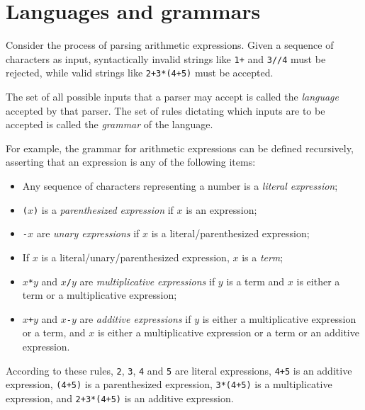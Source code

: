 \documentclass[UdineBachThesis,american,11pt]{PhdThesis}
\begin{document}
  \section{Languages and grammars}

  Consider the process of parsing arithmetic expressions. Given a sequence of
  characters as input, syntactically invalid strings like \mbox{\texttt{1+}} and
  \mbox{\texttt{3//4}} must be rejected, while valid strings like
  \mbox{\texttt{2+3*(4+5)}} must be accepted.

  The set of all possible inputs that a parser may accept is called the
  \emph{language} accepted by that parser. The set of rules dictating which
  inputs are to be accepted is called the \emph{grammar} of the language.

  For example, the grammar for arithmetic expressions can be defined
  recursively, asserting that an expression is any of the following items:

  \begin{itemize}
    \item Any sequence of characters representing a number is a \emph{literal
    expression};

    \item \mbox{\texttt{($x$)}} is a \emph{parenthesized expression} if $x$ is
    an expression;

    \item \mbox{\texttt{-$x$}} are \emph{unary expressions} if $x$ is a
    literal/parenthesized expression;

    \item If $x$ is a literal/unary/parenthesized expression, $x$ is a
    \emph{term};

    \item \mbox{\texttt{$x$*$y$}} and \mbox{\texttt{$x$/$y$}} are
    \emph{multiplicative expressions} if $y$ is a term and $x$ is either a term
    or a multiplicative expression;

    \item \mbox{\texttt{$x$+$y$}} and \mbox{\texttt{$x$-$y$}} are \emph{additive
    expressions} if $y$ is either a multiplicative expression or a term, and $x$
    is either a multiplicative expression or a term or an additive expression.
  \end{itemize}

  According to these rules, \texttt{2}, \texttt{3}, \texttt{4} and \texttt{5}
  are literal expressions, \mbox{\texttt{4+5}} is an additive expression,
  \mbox{\texttt{(4+5)}} is a parenthesized expression, \mbox{\texttt{3*(4+5)}}
  is a multiplicative expression, and \mbox{\texttt{2+3*(4+5)}} is an additive
  expression.
\end{document}
